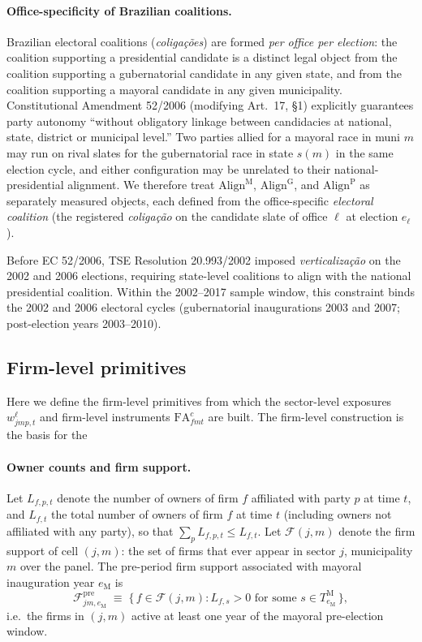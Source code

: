 \documentclass{article}
\newcommand{\Align}{\mathrm{Align}}
\newcommand{\FA}{\mathrm{FA}}
\newcommand{\cF}{\mathcal{F}}
\theoremstyle{plain}
\theoremstyle{definition}
\theoremstyle{remark}
\begin{document}
\paragraph{Office-specificity of Brazilian coalitions.}
Brazilian electoral coalitions (\emph{coligações}) are formed
\emph{per office per election}: the coalition supporting a presidential
candidate is a distinct legal object from the coalition supporting a
gubernatorial candidate in any given state, and from the coalition
supporting a mayoral candidate in any given municipality. Constitutional
Amendment 52/2006 (modifying Art.\ 17, \S1) explicitly guarantees party
autonomy ``without obligatory linkage between candidacies at national,
state, district or municipal level.'' Two parties allied for a mayoral
race in muni $m$ may run on rival slates for the gubernatorial race in
state $s(m)$ in the same election cycle, and either configuration may
be unrelated to their national-presidential alignment. We therefore
treat $\Align^{\mathrm{M}}$, $\Align^{\mathrm{G}}$, and
$\Align^{\mathrm{P}}$ as separately measured objects, each defined from
the office-specific \emph{electoral coalition} (the registered
\emph{coligação} on the candidate slate of office $\ell$ at election
$e_\ell$).

Before EC 52/2006, TSE Resolution 20.993/2002 imposed
\emph{verticalização} on the 2002 and 2006 elections, requiring
state-level coalitions to align with the national presidential
coalition. Within the 2002--2017 sample window, this constraint binds
the 2002 and 2006 electoral cycles (gubernatorial inaugurations 2003 and
2007; post-election years 2003--2010).

\subsection{Firm-level primitives}\label{subsec:firm-primitives}

Here we define the firm-level primitives from which the sector-level exposures $w^{\ell}_{jmp,t}$ and firm-level instruments $\FA^{c}_{fmt}$ are built. The firm-level construction is the basis for the

\paragraph{Owner counts and firm support.}
Let $L_{f,p,t}$ denote the number of owners of firm $f$ affiliated with
party $p$ at time $t$, and $L_{f,t}$ the total number of owners of firm
$f$ at time $t$ (including owners not affiliated with any party), so
that $\sum_{p} L_{f,p,t}\le L_{f,t}$. Let $\cF(j,m)$ denote the firm
support of cell $(j,m)$: the set of firms that ever appear in sector
$j$, municipality $m$ over the panel. The pre-period firm support
associated with mayoral inauguration year $e_{\mathrm{M}}$ is
\[
  \cF^{\mathrm{pre}}_{jm,e_{\mathrm{M}}}
  \;\equiv\;
  \big\{\, f\in\cF(j,m) : L_{f,s}>0
       \text{ for some } s\in T^{\mathrm{M}}_{e_{\mathrm{M}}} \,\big\},
\]
i.e.\ the firms in $(j,m)$ active at least one year of the mayoral
pre-election window.
\end{document}
